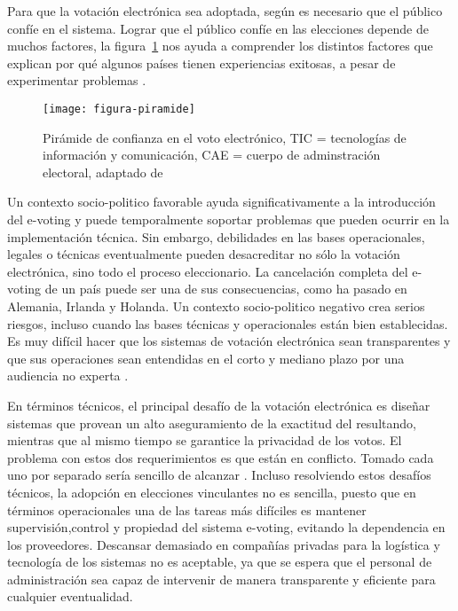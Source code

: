 Para que la votación electrónica sea adoptada, según \cite{InternationalInstituteforDemocracyandElectoralAssistance2011} 
es necesario que el público confíe en el sistema. Lograr que el público confíe en las elecciones
depende de muchos factores, la figura~\ref{fig:piramide} nos ayuda a comprender los distintos 
factores que explican por qué algunos países tienen experiencias exitosas, a pesar de experimentar 
problemas \cite{Schryen2009}.

\begin{figure}[h!]
	\centering
	\texttt{[image: figura-piramide]}
	\caption[Pirámide de confianza en el voto electrónico]{Pirámide de confianza en el voto electrónico,
	 TIC = tecnologías de información y comunicación, CAE = cuerpo de adminstración electoral, 
	adaptado de \cite{InternationalInstituteforDemocracyandElectoralAssistance2011}}
	\label{fig:piramide}
\end{figure}

Un contexto socio-politico favorable ayuda significativamente a la introducción del e-voting y 
puede temporalmente soportar problemas que pueden ocurrir en la implementación técnica. Sin embargo, debilidades
en las bases operacionales, legales o técnicas eventualmente pueden desacreditar no sólo la votación electrónica, 
sino todo el proceso eleccionario. La cancelación completa del e-voting de un país puede ser una de sus consecuencias,
como ha pasado en Alemania, Irlanda y Holanda. Un contexto socio-politico negativo crea serios riesgos, incluso cuando
las bases técnicas y operacionales están bien establecidas. Es muy difícil hacer que los sistemas de votación
electrónica sean transparentes y que sus operaciones sean entendidas en el corto y mediano plazo por una
audiencia no experta \cite{InternationalInstituteforDemocracyandElectoralAssistance2011}.

En términos técnicos, el principal desafío de la votación electrónica es
diseñar sistemas que provean un alto aseguramiento de la exactitud del resultando, mientras que
al mismo tiempo se garantice la privacidad de los votos. El problema con estos dos requerimientos es que 
están en conflicto. Tomado cada uno por separado sería sencillo de alcanzar \cite{Ryan2010}.  Incluso
resolviendo estos desafíos técnicos, la adopción en elecciones vinculantes no es sencilla, puesto que en términos 
operacionales una de las tareas más difíciles es mantener supervisión,control
y propiedad del sistema e-voting, evitando la dependencia en los proveedores. Descansar
demasiado en compañías privadas para la logística y tecnología de los sistemas no es aceptable, ya que 
se espera que el personal de administración sea capaz de intervenir de manera transparente y eficiente para
cualquier eventualidad.

